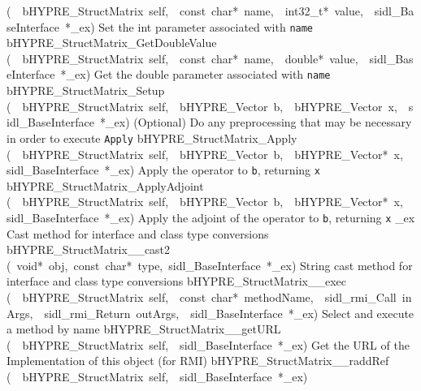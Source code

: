 \documentclass{article}
\begin{document}
\begin{cxxentry}
\begin{cxxentry}
\begin{cxxnames}
        {(\ \ bHYPRE\_StructMatrix\ self,\ \ const\ char*\ name,\ \ int32\_t*\ value,\ \ sidl\_BaseInterface\ *\_ex)}
        {
Set the int parameter associated with {\tt name}}
        {}
\label{cxx.4.3.27}
        {bHYPRE\_StructMatrix\_GetDoubleValue}
        {(\ \ bHYPRE\_StructMatrix\ self,\ \ const\ char*\ name,\ \ double*\ value,\ \ sidl\_BaseInterface\ *\_ex)}
        {
Get the double parameter associated with {\tt name}}
        {}
\label{cxx.4.3.28}
        {bHYPRE\_StructMatrix\_Setup}
        {(\ \ bHYPRE\_StructMatrix\ self,\ \ bHYPRE\_Vector\ b,\ \ bHYPRE\_Vector\ x,\ \ sidl\_BaseInterface\ *\_ex)}
        {
(Optional) Do any preprocessing that may be necessary in
order to execute {\tt Apply}}
        {}
\label{cxx.4.3.29}
        {bHYPRE\_StructMatrix\_Apply}
        {(\ \ bHYPRE\_StructMatrix\ self,\ \ bHYPRE\_Vector\ b,\ \ bHYPRE\_Vector*\ x,\ \ sidl\_BaseInterface\ *\_ex)}
        {
Apply the operator to {\tt b}, returning {\tt x}}
        {}
\label{cxx.4.3.30}
        {bHYPRE\_StructMatrix\_ApplyAdjoint}
        {(\ \ bHYPRE\_StructMatrix\ self,\ \ bHYPRE\_Vector\ b,\ \ bHYPRE\_Vector*\ x,\ \ sidl\_BaseInterface\ *\_ex)}
        {
Apply the adjoint of the operator to {\tt b}, returning {\tt x}}
        {}
\label{cxx.4.3.31}
        {\_ex}
        {}
        {
Cast method for interface and class type conversions}
        {}
\label{cxx.4.3.32}
        {bHYPRE\_StructMatrix\_\_cast2}
        {(\ void*\ obj,\ const\ char*\ type,\ sidl\_BaseInterface\ *\_ex)}
        {
String cast method for interface and class type conversions}
        {}
\label{cxx.4.3.33}
        {bHYPRE\_StructMatrix\_\_exec}
        {(\ \ bHYPRE\_StructMatrix\ self,\ \ const\ char*\ methodName,\ \ sidl\_rmi\_Call\ inArgs,\ \ sidl\_rmi\_Return\ outArgs,\ \ sidl\_BaseInterface\ *\_ex)}
        {
Select and execute a method by name}
        {}
\label{cxx.4.3.34}
        {bHYPRE\_StructMatrix\_\_getURL}
        {(\ \ bHYPRE\_StructMatrix\ self,\ \ sidl\_BaseInterface\ *\_ex)}
        {
Get the URL of the Implementation of this object (for RMI)}
        {}
\label{cxx.4.3.35}
        {bHYPRE\_StructMatrix\_\_raddRef}
        {(\ \ bHYPRE\_StructMatrix\ self,\ \ sidl\_BaseInterface\ *\_ex)}

\end{cxxnames}
\end{cxxentry}
\end{cxxentry}
\end{document}
